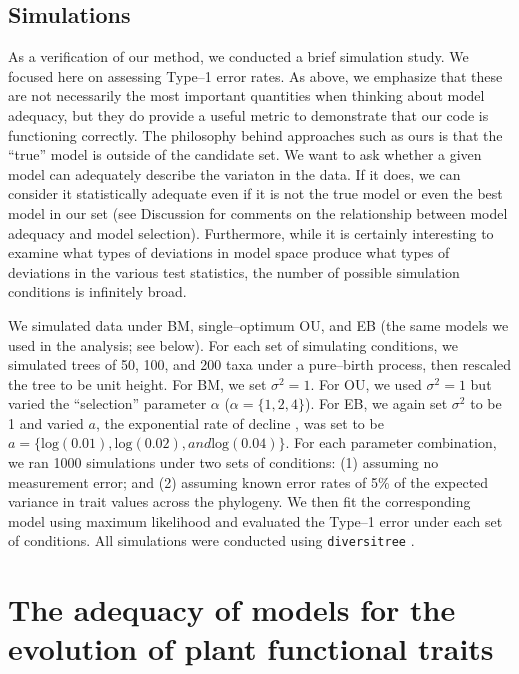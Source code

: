 \documentclass[a4paper,11pt]{article}
\begin{document}
\subsection{Simulations}

As a verification of our method, we conducted a brief simulation study. We focused here on assessing Type--1 error rates. As above, we emphasize that these are not necessarily the most important quantities when thinking about model adequacy, but they do provide a useful metric to demonstrate that our code is functioning correctly. The philosophy behind approaches such as ours is that the ``true'' model is outside of the candidate set. We want to ask whether a given model can adequately describe the variaton in the data. If it does, we can consider it statistically adequate even if it is not the true model or even the best model in our set (see Discussion for comments on the relationship between model adequacy and model selection). Furthermore, while it is certainly interesting to examine what types of deviations in model space produce what types of deviations in the various test statistics, the number of possible simulation conditions is infinitely broad.

We simulated data under BM, single--optimum OU, and EB (the same models we used in the analysis; see below). For each set of simulating conditions, we simulated trees of 50, 100, and 200 taxa under a pure--birth process, then rescaled the tree to be unit height. For BM, we set $\sigma^2=1$. For OU, we used $\sigma^2=1$ but varied the ``selection'' parameter $\alpha$ ($\alpha=\lbrace 1,2,4 \rbrace$). For EB, we again set $\sigma^2$ to be 1 and varied $a$, the exponential rate of decline \citep[see][for details]{Harmon2010, SlaterPennell}, was set to be $a=\lbrace \text{log}(0.01), \text{log}(0.02), and \text{log}(0.04) \rbrace$. For each parameter combination, we ran 1000 simulations under two sets of conditions: (1) assuming no measurement error; and (2) assuming known error rates of 5\% of the expected variance in trait values across the phylogeny. We then fit the corresponding model using maximum likelihood and evaluated the Type--1 error under each set of conditions. All simulations were conducted using \texttt{diversitree} \citep{FitzJohn2012}.


\section{The adequacy of models for the evolution of plant functional traits}
\end{document}
